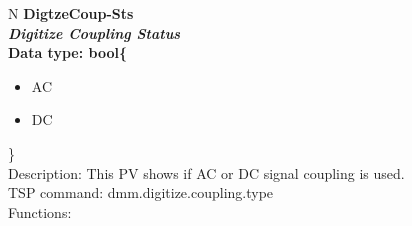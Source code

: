\documentclass[openany]{article}
\begin{document}
		\begin{tabular}{N}
			\hline
			\bfseries DigtzeCoup-Sts\label{pv:digtzecoup-sts} \\ \hline
			\emph{Digitize Coupling Status} \\
			Data type: bool\{\begin{itemize}[noitemsep]
				\small
				\item[] AC
				\item[] DC
			\end{itemize}\} \\
			Description: This PV shows if AC or DC signal coupling is used. \\
			TSP command: dmm.digitize.coupling.type \\
			Functions: \\
			\arrayrulecolor{\FuncTableBorderColor}

		\end{tabular}
\end{document}
